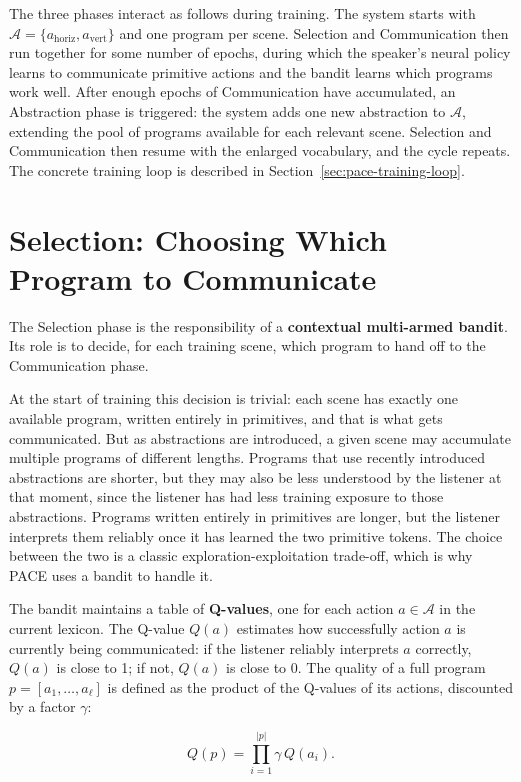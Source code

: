 The three phases interact as follows during training. The system starts with $\mathcal{A} = \{a_{\text{horiz}}, a_{\text{vert}}\}$ and one program per scene. Selection and Communication then run together for some number of epochs, during which the speaker's neural policy learns to communicate primitive actions and the bandit learns which programs work well. After enough epochs of Communication have accumulated, an Abstraction phase is triggered: the system adds one new abstraction to $\mathcal{A}$, extending the pool of programs available for each relevant scene. Selection and Communication then resume with the enlarged vocabulary, and the cycle repeats. The concrete training loop is described in Section~\ref{sec:pace-training-loop}.

\section{Selection: Choosing Which Program to Communicate}
\label{sec:pace-selection}

The Selection phase is the responsibility of a \textbf{contextual multi-armed bandit}. Its role is to decide, for each training scene, which program to hand off to the Communication phase.

At the start of training this decision is trivial: each scene has exactly one available program, written entirely in primitives, and that is what gets communicated. But as abstractions are introduced, a given scene may accumulate multiple programs of different lengths. Programs that use recently introduced abstractions are shorter, but they may also be less understood by the listener at that moment, since the listener has had less training exposure to those abstractions. Programs written entirely in primitives are longer, but the listener interprets them reliably once it has learned the two primitive tokens. The choice between the two is a classic exploration-exploitation trade-off, which is why PACE uses a bandit to handle it.

The bandit maintains a table of \textbf{Q-values}, one for each action $a \in \mathcal{A}$ in the current lexicon. The Q-value $Q(a)$ estimates how successfully action $a$ is currently being communicated: if the listener reliably interprets $a$ correctly, $Q(a)$ is close to 1; if not, $Q(a)$ is close to 0. The quality of a full program $p = [a_1, \ldots, a_\ell]$ is defined as the product of the Q-values of its actions, discounted by a factor $\gamma$:

\begin{equation}
    Q(p) = \prod_{i=1}^{|p|} \gamma \, Q(a_i).
    \label{eq:pace-program-value}
\end{equation}

